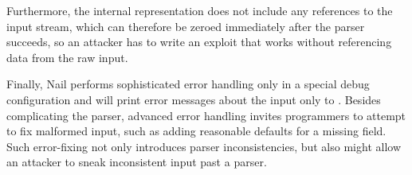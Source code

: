 Furthermore, the internal representation does not include any references to the input stream, which
can therefore be zeroed immediately after the parser succeeds, so an attacker has to write an
exploit that works without referencing data from the raw input.

Finally, Nail performs sophisticated error handling only in a special debug configuration and will print
error messages about the input only to . Besides complicating the parser, advanced error handling
invites programmers to attempt to fix malformed input, such as adding reasonable defaults for a
missing field. Such error-fixing not only introduces parser inconsistencies, but also might allow an
attacker to sneak inconsistent input past a parser.





